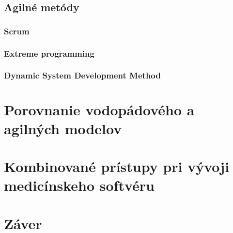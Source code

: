 \documentclass[10pt,twoside,slovak,a4paper]{article}
\begin{document}
\subsection{Agilné metódy}
\subsubsection{Scrum}
\subsubsection{Extreme programming}
\subsubsection{Dynamic System Development Method}
\section{Porovnanie vodopádového a agilných modelov}
\section{Kombinované prístupy pri vývoji medicínskeho softvéru}
\section{Záver}




\end{document}
